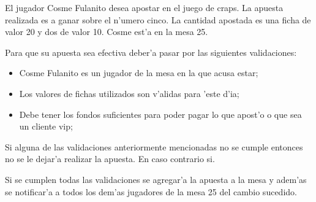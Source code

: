 El jugador Cosme Fulanito desea apostar en el juego de craps. La apuesta realizada es a ganar sobre el n'umero cinco. La cantidad apostada es una ficha de valor 20 y dos de valor 10. Cosme est'a en la mesa 25.



Para que su apuesta sea efectiva deber'a pasar por las siguientes validaciones:

\begin{itemize}
 \item Cosme Fulanito es un jugador de la mesa en la que acusa estar;
 \item Los valores de fichas utilizados son v'alidas para 'este d'ia;
 \item Debe tener los fondos suficientes para poder pagar lo que apost'o o que sea un cliente vip;
\end{itemize}

Si alguna de las validaciones anteriormente mencionadas no se cumple entonces no se le dejar'a realizar la apuesta. En caso contrario si.

Si se cumplen todas las validaciones se agregar'a la apuesta a la mesa y adem'as se notificar'a a todos los dem'as jugadores de la mesa 25 del cambio sucedido.



\clearpage


